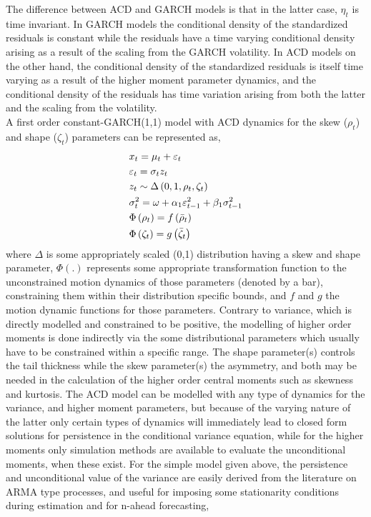 The difference between ACD and GARCH models is that in the latter case, $\eta_t$ is time invariant. In GARCH models the conditional density of the standardized residuals is constant while the residuals have a time varying conditional density arising as a result of the scaling from the GARCH volatility. In ACD models on the other hand, the conditional density of the standardized residuals is itself time varying as a result of the higher moment parameter dynamics, and the conditional density of the residuals has time variation arising from both the latter and the scaling from the volatility.\\
A first order constant-GARCH(1,1) model with ACD dynamics for the skew ($\rho_t$) and shape ($\zeta_t$) parameters can be represented as,
\begin{equation}\label{eq:acd1}
\begin{gathered}
  {x_t} = {\mu _t} + {\varepsilon _t} \hfill \\
  {\varepsilon _t} = {\sigma _t}{z_t} \hfill \\
  {z_t}\sim \Delta \left( {0,1,{\rho _t},{\zeta _t}} \right) \hfill \\
  \sigma _t^2 = \omega  + {\alpha _1}\varepsilon _{t - 1}^2 + {\beta _1}\sigma _{t - 1}^2 \hfill \\
  {\Phi}\left( {{\rho _t}} \right) =  {f}\left( {{{\bar \rho }_t}} \right) \hfill \\
  {\Phi}\left( {{\zeta _t}} \right) = {g}\left( {{{\bar \zeta }_t}} \right) \hfill \\
\end{gathered}
\end{equation}
where $\Delta$ is some appropriately scaled (0,1) distribution having a skew and shape parameter, $\Phi(.)$ represents some appropriate transformation function to the unconstrained motion dynamics of those parameters (denoted by a bar), constraining them within their distribution specific bounds, and $f$ and $g$ the motion dynamic functions for those parameters. Contrary to variance, which is directly modelled and constrained to be positive, the modelling of higher order moments is done indirectly via the some distributional parameters which usually have to be constrained within a specific range. The shape parameter(s) controls the tail thickness while the skew parameter(s) the asymmetry, and both may be needed in the calculation of the higher order central moments such as skewness and kurtosis. The ACD model can be modelled with any type of dynamics for the variance, and higher moment parameters, but because of the varying nature of the latter only certain types of dynamics will immediately lead to closed form solutions for persistence in the conditional variance equation, while for the higher moments only simulation methods are available to evaluate the unconditional moments, when these exist. For the simple model given above, the persistence and unconditional value of the variance are easily derived from the literature on ARMA type processes, and useful for imposing some stationarity conditions during estimation and for n-ahead forecasting,
